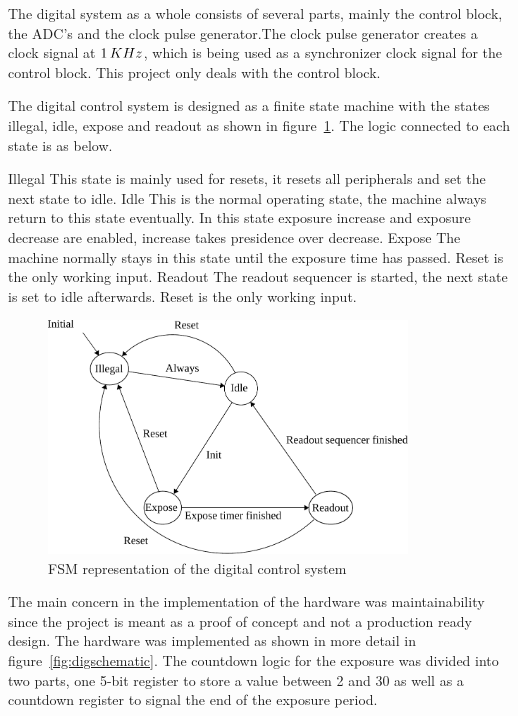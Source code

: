 The digital system as a whole consists of several parts, mainly the control block, the ADC's and the clock pulse generator.The clock pulse generator creates a clock signal at $1 \mskip3mu KHz$, which is being used as a synchronizer clock signal for the control block.
This project only deals with the control block.

The digital control system is designed as a finite state machine with the states illegal, idle, expose and readout as shown in figure~\ref{fig:fsmDiagram}.
The logic connected to each state is as below.

\begin{outline}
  \1 Illegal
  \2 This state is mainly used for resets, it resets all peripherals and set the next state to idle.
  \1 Idle
  \2 This is the normal operating state, the machine always return to this state eventually.
  \2 In this state exposure increase and exposure decrease are enabled, increase takes presidence over decrease.
  \1 Expose
  \2 The machine normally stays in this state until the exposure time has passed.
  \2 Reset is the only working input.
  \1 Readout
  \2 The readout sequencer is started, the next state is set to idle afterwards.
  \2 Reset is the only working input.
\end{outline}

\begin{figure}[p]
  \centering
  \includegraphics[width=0.85\textwidth]{figures/fsmDiagram}
  \caption{FSM representation of the digital control system}
  \label{fig:fsmDiagram}
\end{figure}

The main concern in the implementation of the hardware was maintainability since the project is meant as a proof of concept and not a production ready design.
The hardware was implemented as shown in more detail in figure~\ref{fig:digschematic}.
The countdown logic for the exposure was divided into two parts, one 5-bit register to store a value between 2 and 30 as well as a countdown register
to signal the end of the exposure period.

